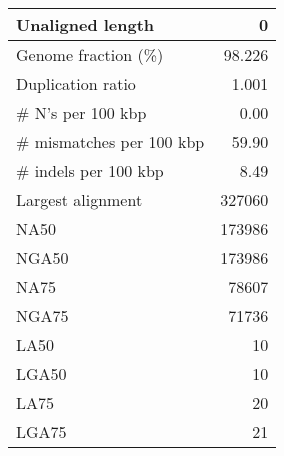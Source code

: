 \documentclass[12pt,a4paper]{article}
\begin{document}
\begin{table}[ht]
\begin{center}
\begin{tabular}{|l*{1}{|r}|}
Unaligned length & 0 \\ \hline
Genome fraction (\%) & 98.226 \\ \hline
Duplication ratio & 1.001 \\ \hline
\# N's per 100 kbp & 0.00 \\ \hline
\# mismatches per 100 kbp & 59.90 \\ \hline
\# indels per 100 kbp & 8.49 \\ \hline
Largest alignment & 327060 \\ \hline
NA50 & 173986 \\ \hline
NGA50 & 173986 \\ \hline
NA75 & 78607 \\ \hline
NGA75 & 71736 \\ \hline
LA50 & 10 \\ \hline
LGA50 & 10 \\ \hline
LA75 & 20 \\ \hline
LGA75 & 21 \\ \hline
\end{tabular}
\end{center}
\end{table}
\end{document}
